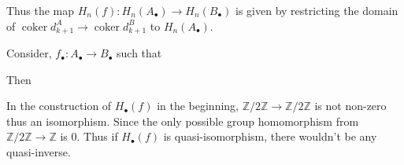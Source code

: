 \documentclass[10pt]{article}
\DeclareMathOperator{\coker}{coker}
\newcommand{\Z}[0]{\mathbb{Z}}
\begin{document}
Thus the map $H_n(f):H_n(A_\bullet)\to H_n(B_\bullet)$ is given by restricting the domain of $\coker d_{k+1}^A\to\coker d_{k+1}^B$ to $H_n(A_\bullet)$.
\par Consider, $f_\bullet:A_\bullet\to B_\bullet$ such that
\begin{center}
\end{center}
Then
\begin{center}
\end{center}
In the construction of $H_\bullet(f)$ in the beginning, $\Z/2\Z\to\Z/2\Z$ is not non-zero thus an isomorphism. Since the only possible group homomorphism from $\Z/2\Z\to\Z$ is $0$. Thus if $H_\bullet(f)$ is quasi-isomorphism, there wouldn't be any quasi-inverse.
\end{document}
